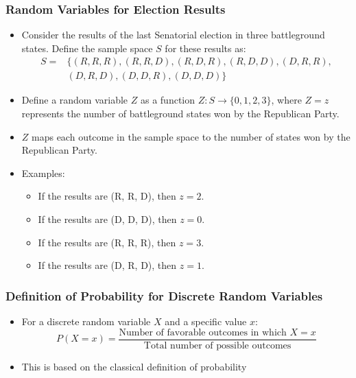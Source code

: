 \documentclass[handout]{beamer} %
\begin{document}
\begin{frame}
    \frametitle{Random Variables for Election Results}
    \begin{itemize}
        \item Consider the results of the last Senatorial election in three battleground states. Define the sample space \( S \) for these results as: \pause \vspace{-1em}
        \begin{align*}
        S =& \big\{ (R, R, R), (R, R, D), (R, D, R), (R, D, D), (D, R, R),\\
        & (D, R, D), (D, D, R), (D, D, D) \big\}
        \end{align*} \pause \vspace{-2.5em}
        \item Define a random variable \( Z \) as a function \( Z: S \rightarrow \{0, 1, 2, 3\} \), where \( Z=z \) represents the number of battleground states won by the Republican Party. \pause
        \item \( Z \) maps each outcome in the sample space to the number of states won by the Republican Party. \pause
        \item Examples: \pause
        \begin{itemize}
            \item If the results are (R, R, D), then \( z = 2 \). \pause
            \item If the results are (D, D, D), then \( z = 0 \). \pause
            \item If the results are (R, R, R), then \( z = 3 \). \pause
            \item If the results are (D, R, D), then \( z = 1 \). \pause
        \end{itemize}
    \end{itemize}
\end{frame}


\begin{frame}
    \frametitle{Definition of Probability for Discrete Random Variables}


     \pause

    \begin{itemize}
        \item For a discrete random variable \( X \) and a specific value \( x \): \pause
        \[
        P(X = x) = \frac{\text{Number of favorable outcomes in which } X = x}{\text{Total number of possible outcomes}}
        \] \pause \vspace{-1.0em}
        \item This is based on the classical definition of probability \pause
    \end{itemize}
\end{frame}
\end{document}
